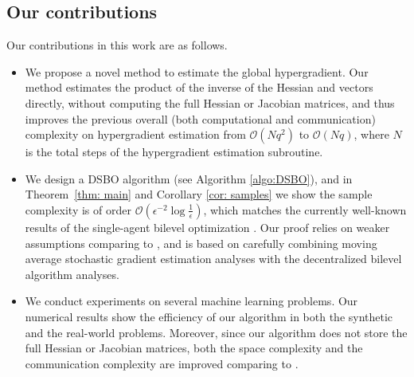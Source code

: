 \documentclass{article}
\theoremstyle{plain}
\theoremstyle{definition}
\theoremstyle{remark}
\newcommand{\cO}{\mathcal{O}}
\begin{document}
\subsection{Our contributions}
Our contributions in this work are as follows. 
\begin{itemize}[noitemsep,leftmargin=*]
    \item We propose a novel method to estimate the global hypergradient. Our method estimates the product of the inverse of the Hessian and vectors directly, without computing the full Hessian or Jacobian matrices, and thus improves the previous overall (both computational and communication) complexity on hypergradient estimation from $\cO(Nq^2)$ to $\cO(Nq)$, where $N$ is the total steps of the hypergradient estimation subroutine.
    
    \item We design a DSBO algorithm (see Algorithm \ref{algo:DSBO}), and in Theorem~\ref{thm: main} and Corollary \ref{cor: samples} we show the sample complexity is of order $\cO(\epsilon^{-2}\log \frac{1}{\epsilon})$, which matches the currently well-known results of the single-agent bilevel optimization \citep{chen2021closing}. Our proof relies on weaker assumptions comparing to \citet{yang2022decentralized}, and is based on carefully combining moving average stochastic gradient estimation analyses with the decentralized bilevel algorithm analyses.
    

\item We conduct experiments on several machine learning problems. Our numerical results show the efficiency of our algorithm in both the synthetic and the real-world problems. Moreover, since our algorithm does not store the full Hessian or Jacobian matrices, both the space complexity and the communication complexity are improved comparing to \citet{chen2022decentralized, yang2022decentralized}. 
\end{itemize}
\end{document}
